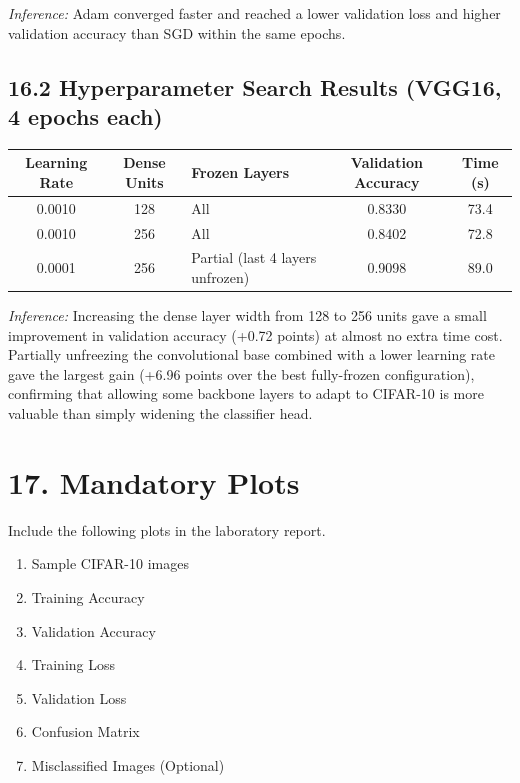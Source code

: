 \documentclass[11pt]{article}
\begin{document}
\textit{Inference:} Adam converged faster and reached a lower validation
loss and higher validation accuracy than SGD within the same epochs.

\subsection*{16.2 Hyperparameter Search Results (VGG16, 4 epochs each)}

\begin{center}
\begin{tabular}{|c|c|l|c|c|}
\hline
Learning Rate & Dense Units & Frozen Layers & Validation Accuracy & Time (s)\\
\hline
0.0010 & 128 & All & 0.8330 & 73.4\\
0.0010 & 256 & All & 0.8402 & 72.8\\
0.0001 & 256 & Partial (last 4 layers unfrozen) & 0.9098 & 89.0\\
\hline
\end{tabular}
\end{center}

\textit{Inference:} Increasing the dense layer width from 128 to 256
units gave a small improvement in validation accuracy (+0.72 points) at
almost no extra time cost. Partially unfreezing the convolutional base
combined with a lower learning rate gave the largest gain
(+6.96 points over the best fully-frozen configuration), confirming that
allowing some backbone layers to adapt to CIFAR-10 is more valuable than
simply widening the classifier head.


\section*{17. Mandatory Plots}

Include the following plots in the laboratory report.

\begin{enumerate}

\item Sample CIFAR-10 images

\item Training Accuracy

\item Validation Accuracy

\item Training Loss

\item Validation Loss

\item Confusion Matrix

\item Misclassified Images (Optional)

\end{enumerate}
\end{document}
